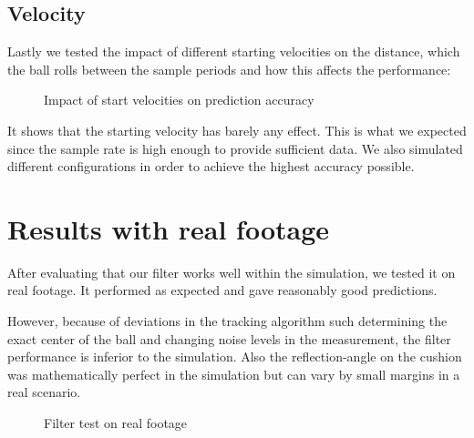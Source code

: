 \documentclass[notitlepage, a4paper, 11pt]{scrartcl}
\begin{document}
\begin{multicols}{2}
\subsection{Velocity}

Lastly we tested the impact of different starting velocities on the distance, which the ball rolls between the sample periods and how this affects the performance:

\begin{figure}[H]
    \centering
    \caption{Impact of start velocities on prediction accuracy}
    \label{fig:velocity300}
\end{figure}

It shows that the starting velocity has barely any effect. 
This is what we expected since the sample rate is high enough to provide sufficient data. 
We also simulated different configurations in order to achieve the highest accuracy possible.

\section{Results with real footage}

After evaluating that our filter works well within the simulation, we tested it on real footage. 
It performed as expected and gave reasonably good predictions.

However, because of deviations in the tracking algorithm such determining the exact center of the ball and changing noise levels in the measurement, 
the filter performance is inferior to the simulation. Also the reflection-angle on the cushion was mathematically perfect in the simulation
but can vary by small margins in a real scenario.

\begin{figure}[H]
    \centering
    \caption{Filter test on real footage}
    \label{fig:realfootage}
\end{figure}


\end{multicols}
\end{document}
